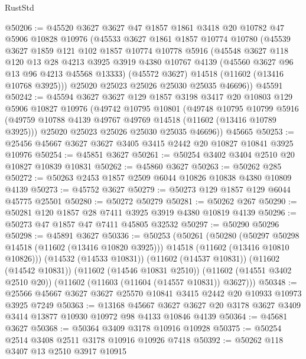 \begin{lexlean}{RustStd}
\begin{coremodule}
@50206 := @45520
    @3627
    @3627
    @47
    @1857
    @1861
    @3418
    @20
    @10782
    @47
    @5906
    @10828
    @10976
    (@45533
      @3627
      @1861
      @1857
      @10774
      @10780
      (@45539
        @3627
        @1859
        @121
        @102
        @1857
        @10774
        @10778
        @5916
        (@45548
          @3627
          @118
          @120
          @13
          @28
          @4213
          @3925
          @3919
          @4380
          @10767
          @4139
          (@45560 @3627 @96 @13 @96 @4213 @45568 @13333)
          (@45572 @3627)
          @14518
          (@11602 (@13416 @10768 @3925)))
        @25020
        @25023
        @25026
        @25030
        @25035
        @46696))
    @45591
@50242 := @45594
    @3627
    @3627
    @129
    @1857
    @3198
    @3417
    @20
    @10803
    @129
    @5906
    @10827
    @10976
    (@49742
      @10795
      @10801
      (@49748
        @10795
        @10799
        @5916
        (@49759 @10788 @4139 @49767 @49769 @14518 (@11602 (@13416 @10789 @3925)))
        @25020
        @25023
        @25026
        @25030
        @25035
        @46696))
    @45665
@50253 := @25456 @45667 @3627 @3627 @3405 @3415 @2442 @20 @10827 @10841 @3925 @10976
@50254 := @45851 @3627
@50261 := @50254 @3402 @3404 @2510 @20 @10827 @10839 @10831
@50262 := @45860 @3627
@50263 := @50262 @285
@50272 := @50263 @2453 @1857 @2509 @6044 @10826 @10838 @4380 @10809 @4139
@50273 := @45752 @3627
@50279 := @50273 @129 @1857 @129 @6044 @45775 @25501
@50280 := @50272 @50279
@50281 := @50262 @267
@50290 := @50281 @120 @1857 @28 @7411 @3925 @3919 @4380 @10819 @4139
@50296 := @50273 @47 @1857 @47 @7411 @45805 @32532
@50297 := @50290 @50296
@50298 := @45891 @3627
@50336 := @50253
    (@50261
      (@50280
        (@50297 @50298 @14518 (@11602 (@13416 @10820 @3925)))
        @14518
        (@11602 (@13416 @10810 @10826)))
      (@14532 (@14533 @10831))
      (@11602 (@14537 @10831))
      (@11602 (@14542 @10831))
      (@11602 (@14546 @10831 @2510))
      (@11602 (@14551 @3402 @2510 @20))
      (@11602 (@11603 (@11604 (@14557 @10831)) @3627)))
@50348 := @25566 @45667 @3627 @3627 @25570 @10841 @3415 @2442 @20 @10933 @10973 @3925 @7249
@50363 := @13168
    @45667
    @3627
    @3627
    @20
    @3178
    @3627
    @3409
    @3414
    @13877
    @10930
    @10972
    @98
    @4133
    @10846
    @4139
@50364 := @45681 @3627
@50368 := @50364 @3409 @3178 @10916 @10928
@50375 := @50254 @2514 @3408 @2511 @3178 @10916 @10926 @7418
@50392 := @50262
    @118
    @3407
    @13
    @2510
    @3917
    @10915

\end{coremodule}
\end{lexlean}
